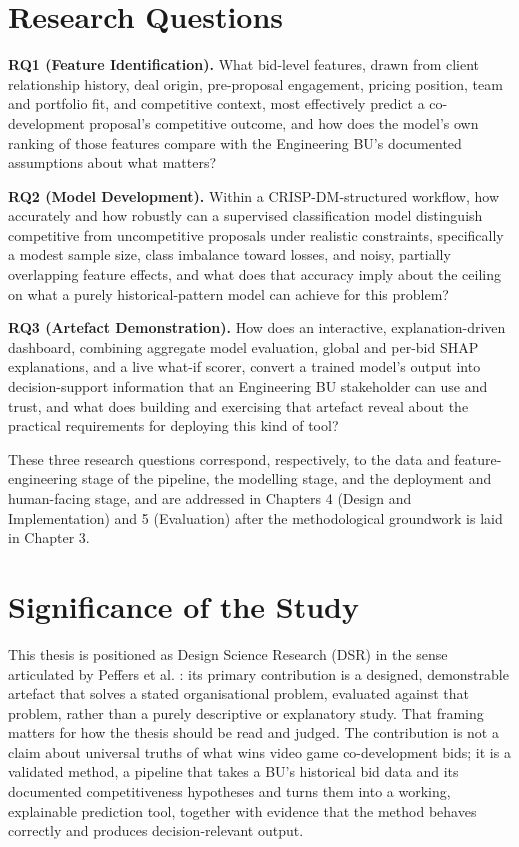 \documentclass[12pt,oneside]{report}
\begin{document}
\hypertarget{research-questions}{%
\section{Research Questions}\label{research-questions}}

\textbf{RQ1 (Feature Identification).} What bid-level features, drawn
from client relationship history, deal origin, pre-proposal engagement,
pricing position, team and portfolio fit, and competitive context, most
effectively predict a co-development proposal's competitive outcome, and
how does the model's own ranking of those features compare with the
Engineering BU's documented assumptions about what matters?

\textbf{RQ2 (Model Development).} Within a CRISP-DM-structured workflow,
how accurately and how robustly can a supervised classification model
distinguish competitive from uncompetitive proposals under realistic
constraints, specifically a modest sample size, class imbalance toward
losses, and noisy, partially overlapping feature effects, and what does
that accuracy imply about the ceiling on what a purely
historical-pattern model can achieve for this problem?

\textbf{RQ3 (Artefact Demonstration).} How does an interactive,
explanation-driven dashboard, combining aggregate model evaluation,
global and per-bid SHAP explanations, and a live what-if scorer, convert
a trained model's output into decision-support information that an
Engineering BU stakeholder can use and trust, and what does building and
exercising that artefact reveal about the practical requirements for
deploying this kind of tool?

These three research questions correspond, respectively, to the data and
feature-engineering stage of the pipeline, the modelling stage, and the
deployment and human-facing stage, and are addressed in Chapters 4
(Design and Implementation) and 5 (Evaluation) after the methodological
groundwork is laid in Chapter 3.

\hypertarget{significance-of-the-study}{%
\section{Significance of the Study}\label{significance-of-the-study}}

This thesis is positioned as Design Science Research (DSR) in the sense
articulated by Peffers et al. \citep{peffers2007design}: its primary
contribution is a designed, demonstrable artefact that solves a stated
organisational problem, evaluated against that problem, rather than a
purely descriptive or explanatory study. That framing matters for how
the thesis should be read and judged. The contribution is not a claim
about universal truths of what wins video game co-development bids; it
is a validated method, a pipeline that takes a BU's historical bid data
and its documented competitiveness hypotheses and turns them into a
working, explainable prediction tool, together with evidence that the
method behaves correctly and produces decision-relevant output.
\end{document}
